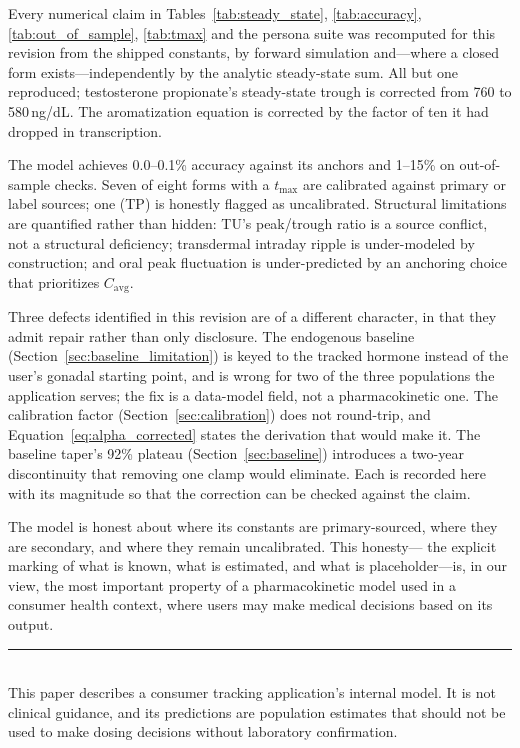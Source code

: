 \documentclass[11pt,a4paper]{article}
\begin{document}
Every numerical claim in Tables~\ref{tab:steady_state},
\ref{tab:accuracy}, \ref{tab:out_of_sample}, \ref{tab:tmax} and the persona
suite was recomputed for this revision from the shipped constants, by
forward simulation and---where a closed form exists---independently by the
analytic steady-state sum. All but one reproduced; testosterone propionate's
steady-state trough is corrected from 760 to 580\,ng/dL. The aromatization
equation is corrected by the factor of ten it had dropped in transcription.

The model achieves 0.0--0.1\% accuracy against its anchors and 1--15\%
on out-of-sample checks. Seven of eight forms with a $t_{\max}$ are
calibrated against primary or label sources; one (TP) is honestly
flagged as uncalibrated. Structural limitations are quantified rather
than hidden: TU's peak/trough ratio is a source conflict, not a
structural deficiency; transdermal intraday ripple is under-modeled by
construction; and oral peak fluctuation is under-predicted by an
anchoring choice that prioritizes $C_{\mathrm{avg}}$.

Three defects identified in this revision are of a different character, in
that they admit repair rather than only disclosure. The endogenous baseline
(Section~\ref{sec:baseline_limitation}) is keyed to the tracked hormone
instead of the user's gonadal starting point, and is wrong for two of the
three populations the application serves; the fix is a data-model field, not
a pharmacokinetic one. The calibration factor
(Section~\ref{sec:calibration}) does not round-trip, and
Equation~\ref{eq:alpha_corrected} states the derivation that would make it.
The baseline taper's 92\% plateau (Section~\ref{sec:baseline}) introduces a
two-year discontinuity that removing one clamp would eliminate. Each is
recorded here with its magnitude so that the correction can be checked
against the claim.

The model is honest about where its constants are primary-sourced, where
they are secondary, and where they remain uncalibrated. This honesty---
the explicit marking of what is known, what is estimated, and what is
placeholder---is, in our view, the most important property of a
pharmacokinetic model used in a consumer health context, where users
may make medical decisions based on its output.

\vfill
\noindent\rule{\linewidth}{0.4pt}\\[0.3em]
{\footnotesize This paper describes a consumer tracking application's
internal model. It is not clinical guidance, and its predictions are
population estimates that should not be used to make dosing decisions
without laboratory confirmation.}
\end{document}
